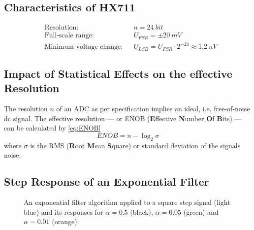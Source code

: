         \subsection{Characteristics of HX711}\label{sec:A6 characteristics of the HX711}%
            \begin{align}
                &\text{Resolution:}             &&n = \SI{24}{bit}\\
                &\text{Full-scale range:}       &&U_{FSR} = \pm \SI{20}{mV}\\
                &\text{Minimum voltage change:} &&U_{LSB} = U_{FSR} \cdot 2^{-24} \approx \SI{1.2}{nV}
            \end{align}
        \subsection{Impact of Statistical Effects on the effective Resolution}\label{sec:A7 statistical effects}%
            The resolution \( n \) of an ADC as per specification implies an ideal, i.e. free-of-noise dc signal. The effective resolution —
            or ENOB (\textbf{E}ffective \textbf{N}umber \textbf{O}f \textbf{B}its) — can be calculated by \cref{eq:ENOB}
            \begin{equation}
                ENOB = n - \log_2{\sigma}
                \label{eq:ENOB}
            \end{equation}
            where \( \sigma \) is the RMS (\textbf{R}oot \textbf{M}ean \textbf{S}quare) or standard deviation of the signals noise.
        \subsection{Step Response of an Exponential Filter}\label{sec:A8 step response expo filter}%
            \begin{figure}[H]
                \centering
                
                \caption[Exponential filter applied to square step signal]{An exponential filter algorithm applied to a square step signal (light blue) and its responses
                for \(\alpha = 0.5\) (black), \(\alpha = 0.05\) (green) and \(\alpha = 0.01\) (orange).}
                \label{fig:all step response samples}
            \end{figure}

